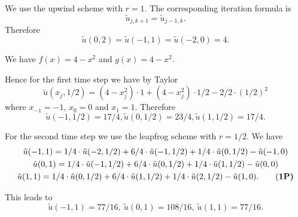 \begin{loesung}
\begin{teilaufgaben}
\item
We use the upwind scheme with $r = 1$.
The corresponding iteration formula is
\begin{equation}
\tilde u_{j,k+1} = \tilde u_{j-1,k}.
\tag{\bf 1P}
\end{equation}
Therefore
\begin{equation}
\tilde u(0,2) = \tilde u(-1,1) = \tilde u(-2,0)
=
4.
\tag{\bf 1P}
\end{equation}

\item
We have $f(x) = 4 - x^2$ and $g(x) = 4 - x^2$. 

Hence for the first time step we have by Taylor
\begin{equation}
\tilde u(x_j, 1/2)
=
(4 - x_j^2) \cdot 1 + (4 - x_j^2) \cdot 1/2 - 2/2 \cdot (1/2)^2
\tag{\bf 1P}
\end{equation}
where $x_{-1} = -1$, $x_0 = 0$ and $x_1 = 1$.
Therefore
\begin{equation}
\tilde u(-1, 1/2)
=
17/4, \tilde u(0, 1/2) = 23/4, \tilde u(1, 1/2)
=
17/4.
\tag{\bf 1P}
\end{equation}

For the second time step we use the leapfrog scheme with $r = 1/2$. We have
\begin{gather}
\tilde u(-1, 1)
=
1/4 \cdot \tilde u(-2, 1/2)
+
6/4 \cdot \tilde u(-1,1/2)
+
1/4 \cdot  \tilde u(0, 1/2)
-
\tilde u(-1,0)
\notag
\\
\tilde u(0, 1)
=
1/4 \cdot \tilde u(-1, 1/2)
+
6/4 \cdot \tilde u(0,1/2)
+
1/4 \cdot  \tilde u(1, 1/2)
-
\tilde u(0,0)
\notag
\\
\tilde u(1, 1)
=
1/4 \cdot \tilde u(0, 1/2)
+ 6/4 \cdot \tilde u(1,1/2)
+ 1/4 \cdot  \tilde u(2, 1/2)
-
\tilde u(1,0).
\tag{\bf 1P}
\end{gather}

This leads to
\begin{equation}
\tilde u(-1, 1)
=
77/16, \ \tilde u(0, 1) = 108/16, \ \tilde u(1, 1)
=
77/16.
\tag{\bf 1P}
\end{equation}
\end{teilaufgaben}
\end{loesung}

